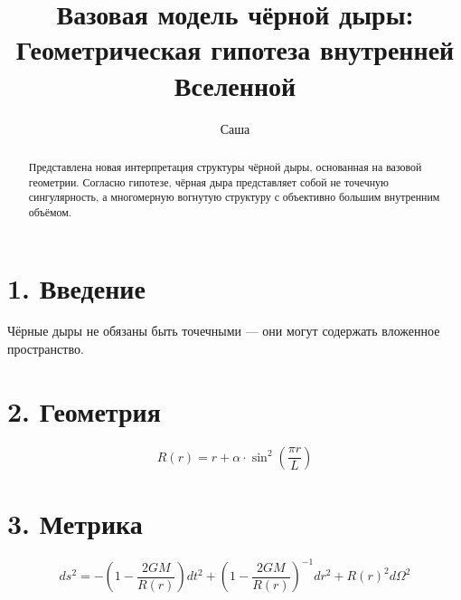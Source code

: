 \documentclass[12pt]{article}
\title{Вазовая модель чёрной дыры: Геометрическая гипотеза внутренней Вселенной}
\author{Саша}
\date{}
\begin{document}
\maketitle

\begin{abstract}
Представлена новая интерпретация структуры чёрной дыры, основанная на вазовой геометрии. Согласно гипотезе, чёрная дыра представляет собой не точечную сингулярность, а многомерную вогнутую структуру с объективно большим внутренним объёмом.
\end{abstract}

\section*{1. Введение}
Чёрные дыры не обязаны быть точечными — они могут содержать вложенное пространство.

\section*{2. Геометрия}
\[
R(r) = r + \alpha \cdot \sin^2\left(\frac{\pi r}{L}\right)
\]

\section*{3. Метрика}
\[
ds^2 = -\left(1 - \frac{2GM}{R(r)}\right) dt^2 + \left(1 - \frac{2GM}{R(r)}\right)^{-1} dr^2 + R(r)^2 d\Omega^2
\]
\end{document}
